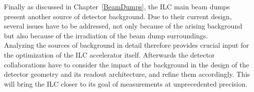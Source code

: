 Finally as discussed in Chapter~\ref{BeamDumps}, the ILC main beam dumps present another source of detector background.
Due to their current design, several issues have to be addressed, not only because of the arising background but also because of the irradiation of the beam dump surroundings.
\\Analyzing the sources of background in detail therefore provides crucial input for the optimization of the ILC accelerator itself.
Afterwards the detector collaborations have to consider the impact of the background in the design of the detector geometry and its readout architecture, and refine them accordingly.
This will bring the ILC closer to its goal of measurements at unprecedented precision.